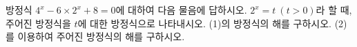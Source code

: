 방정식 $4^x-6\times 2^x+8=0$에 대하여 다음 물음에 답하시오.
 $2^x=t\ (t>0)$라 할 때, 주어진 방정식을 $t$에 대한 방정식으로 나타내시오.
 (1)의 방정식의 해를 구하시오.
 (2)를 이용하여 주어진 방정식의 해를 구하시오.
